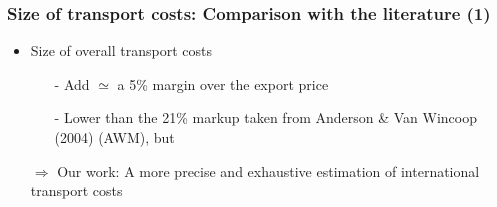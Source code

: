 \documentclass[10 pt,Helvetica, french]{beamer}
\begin{document}
\begin{frame}[label=app_result1]
\frametitle{Size of transport costs: Comparison with the literature (1)}

\begin{itemize}
\item Size of overall transport costs \vspace{0.1cm}
\begin{itemize}
\item[-] Add $\simeq$ a 5\% margin over the export price \vspace{0.1cm}
\item[-] Lower than the 21\% markup taken from Anderson \& Van Wincoop (2004) (AWM), but  \vspace{0.1cm}
\end{itemize}
\item[$\Rightarrow$] Our work: A more precise and exhaustive estimation of international transport costs \vspace{0.1cm}
\end{itemize}
\hyperlink{slide_result1}{}
\end{frame}
\end{document}
